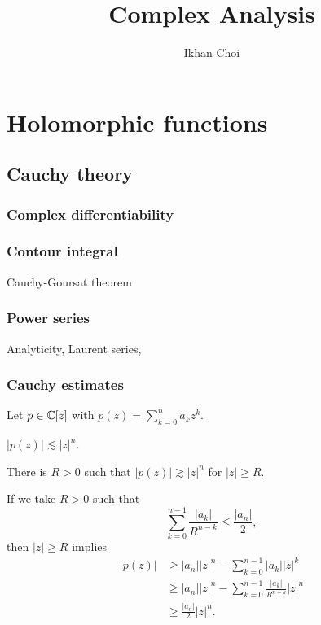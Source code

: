 \documentclass{../note}
\begin{document}
\title{Complex Analysis}
\author{Ikhan Choi}
\maketitle
\tableofcontents


\part{Holomorphic functions}


\chapter{Cauchy theory}
\section{Complex differentiability}
\section{Contour integral}
Cauchy-Goursat theorem

\section{Power series}
Analyticity,
Laurent series,

\section{Cauchy estimates}

\begin{prb}
Let $p\in\mathbb{C}[z]$ with $p(z)=\sum_{k=0}^na_kz^k$.
\begin{parts}
\item $|p(z)|\lesssim|z|^n$.
\item There is $R>0$ such that $|p(z)|\gtrsim|z|^n$ for $|z|\ge R$.
\end{parts}
\end{prb}
\begin{pf}
If we take $R>0$ such that
\[\sum_{k=0}^{n-1}\frac{|a_k|}{R^{n-k}}\le\frac{|a_n|}2,\]
then $|z|\ge R$ implies
\begin{align*}
|p(z)|&\ge|a_n||z|^n-\sum_{k=0}^{n-1}|a_k||z|^k\\
&\ge|a_n||z|^n-\sum_{k=0}^{n-1}\frac{|a_k|}{R^{n-k}}|z|^n\\
&\ge\frac{|a_n|}2|z|^n.
\end{align*}
\end{pf}
\end{document}
